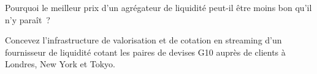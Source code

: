 \begin{interviewq}\label{iq:nw:fx-connectivity:5}
Pourquoi le meilleur prix d'un agrégateur de liquidité peut-il être moins bon qu'il n'y paraît~?
\end{interviewq}

\begin{interviewq}\label{iq:nw:fx-connectivity:6}
Concevez l'infrastructure de valorisation et de cotation en streaming d'un fournisseur de liquidité cotant les paires de devises G10 auprès de clients à Londres, New York et Tokyo.
\end{interviewq}
